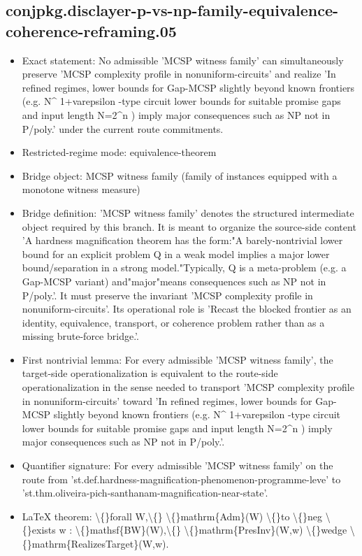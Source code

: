\documentclass[11pt]{article}
\begin{document}
\subsection*{conjpkg.disclayer-p-vs-np-family-equivalence-coherence-reframing.05}
\begin{itemize}
\item Exact statement: No admissible 'MCSP witness family' can simultaneously preserve 'MCSP complexity profile in nonuniform-circuits' and realize 'In refined regimes, lower bounds for Gap-MCSP slightly beyond known frontiers (e.g. N\textasciicircum{} 1+varepsilon -type circuit lower bounds for suitable promise gaps and input length N=2\textasciicircum{}n ) imply major consequences such as NP not in P/poly.' under the current route commitments.
\item Restricted-regime mode: equivalence-theorem
\item Bridge object: MCSP witness family (family of instances equipped with a monotone witness measure)
\item Bridge definition: 'MCSP witness family' denotes the structured intermediate object required by this branch. It is meant to organize the source-side content 'A hardness magnification theorem has the form:"A barely-nontrivial lower bound for an explicit problem Q in a weak model implies a major lower bound/separation in a strong model."Typically, Q is a meta-problem (e.g. a Gap-MCSP variant) and"major"means consequences such as NP not in P/poly.'. It must preserve the invariant 'MCSP complexity profile in nonuniform-circuits'. Its operational role is 'Recast the blocked frontier as an identity, equivalence, transport, or coherence problem rather than as a missing brute-force bridge.'.
\item First nontrivial lemma: For every admissible 'MCSP witness family', the target-side operationalization is equivalent to the route-side operationalization in the sense needed to transport 'MCSP complexity profile in nonuniform-circuits' toward 'In refined regimes, lower bounds for Gap-MCSP slightly beyond known frontiers (e.g. N\textasciicircum{} 1+varepsilon -type circuit lower bounds for suitable promise gaps and input length N=2\textasciicircum{}n ) imply major consequences such as NP not in P/poly.'.
\item Quantifier signature: For every admissible 'MCSP witness family' on the route from 'st.def.hardness-magnification-phenomenon-programme-leve' to 'st.thm.oliveira-pich-santhanam-magnification-near-state'.
\item LaTeX theorem: \textbackslash\{\}forall W,\textbackslash\{\} \textbackslash\{\}mathrm\{Adm\}(W) \textbackslash\{\}to \textbackslash\{\}neg \textbackslash\{\}exists w : \textbackslash\{\}mathsf\{BW\}(W),\textbackslash\{\} \textbackslash\{\}mathrm\{PresInv\}(W,w) \textbackslash\{\}wedge \textbackslash\{\}mathrm\{RealizesTarget\}(W,w).

\end{itemize}
\end{document}
